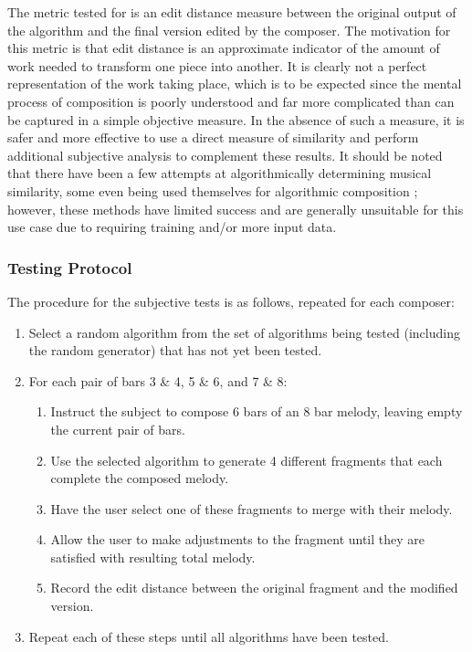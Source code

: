 \documentclass[ author={Stephen Livermore-Tozer},
				supervisor={Dr. Peter Flach},
				degree={MEng},
				title={Algorithmic Co-composition Using Machine Learning},
				subtitle={},
				type={research},
				year={2016} ]{dissertation}
\begin{document}
	The metric tested for is an edit distance measure between the original output of the algorithm and the final version edited by the composer. The motivation for this metric is that edit distance is an approximate indicator of the amount of work needed to transform one piece into another. It is clearly not a perfect representation of the work taking place, which is to be expected since the mental process of composition is poorly understood and far more complicated than can be captured in a simple objective measure. In the absence of such a measure, it is safer and more effective to use a direct measure of similarity and perform additional subjective analysis to complement these results. It should be noted that there have been a few attempts at algorithmically determining musical similarity, some even being used themselves for algorithmic composition \cite{burton1998hybrid}; however, these methods have limited success and are generally unsuitable for this use case due to requiring training and/or more input data.
	
	
	\subsubsection{Testing Protocol}
	
	The procedure for the subjective tests is as follows, repeated for each composer:
	\begin{enumerate}
		\item Select a random algorithm from the set of algorithms being tested (including the random generator) that has not yet been tested.
		\item For each pair of bars 3 \& 4, 5 \& 6, and 7 \& 8:
		\begin{enumerate}
			\item Instruct the subject to compose 6 bars of an 8 bar melody, leaving empty the current pair of bars.
			\item Use the selected algorithm to generate 4 different fragments that each complete the composed melody.
			\item Have the user select one of these fragments to merge with their melody.
			\item Allow the user to make adjustments to the fragment until they are satisfied with resulting total melody.
			\item Record the edit distance between the original fragment and the modified version.
		\end{enumerate}
		\item Repeat each of these steps until all algorithms have been tested.
	\end{enumerate}
	
\end{document}
